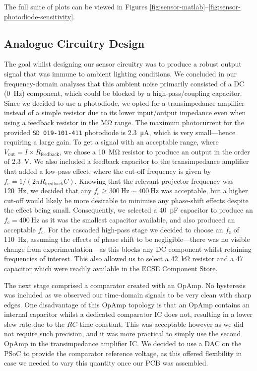 \documentclass[conference]{IEEEtran}
\begin{document}
The full suite of plots can be viewed in Figures \ref{fig:sensor-matlab}–\ref{fig:sensor-photodiode-sensitivity}.

\subsection{Analogue Circuitry Design \label{subsect:analogue}}

The goal whilst designing our sensor circuitry was to produce a robust output signal that was immune to ambient lighting conditions.
We concluded in our frequency-domain analyses that this ambient noise primarily consisted of a DC (\qty{0}{\hertz}) component, which could be blocked by a high-pass/coupling capacitor.
Since we decided to use a photodiode, we opted for a transimpedance amplifier instead of a simple resistor due to its lower input/output impedance even when using a feedback resistor in the \unit{\Mohm} range.
The maximum photocurrent for the provided \texttt{SD 019-101-411} photodiode is \qty{2.3}{\uA}, which is very small—hence requiring a large gain.
To get a signal with an acceptable range, where $V_\text{out} = I \times R_\text{feedback}$, we chose a \qty{10}{\Mohm} resistor to produce an output in the order of \qty{2.3}{\volt}.
We also included a feedback capacitor to the transimpedance amplifier that added a low-pass effect, where the cut-off frequency is given by $f_\text{c} = 1 / (2\pi R_\text{feedback}C)$.
Knowing that the relevant projector frequency was \qty{120}{\hertz}, we decided that any $f_\text{c}\geq \qty{300}{\hertz}\sim \qty{400}{\hertz}$ was acceptable, but a higher cut-off would likely be more desirable to minimise any phase-shift effects despite the effect being small.
Consequently, we selected a \qty{40}{\pF} capacitor to produce an $f_\text{c}=\qty{400}{\hertz}$ as it was the smallest capacitor available, and also produced an acceptable $f_\text{c}$.
For the cascaded high-pass stage we decided to choose an $f_\text{c}$ of \qty{110}{\hertz}, assuming the effects of phase shift to be negligible—there was no visible change from experimentation—as this blocks any DC component whilst retaining frequencies of interest.
This also allowed us to select a \qty{42}{\kohm} resistor and a \qty{47}{\uF} capacitor which were readily available in the ECSE Component Store.

The next stage comprised a comparator created with an OpAmp.
No hysteresis was included as we observed our time-domain signals to be very clean with sharp edges.
One disadvantage of this OpAmp topology is that an OpAmp contains an internal capacitor whilst a dedicated comparator IC does not, resulting in a lower slew rate due to the $RC$ time constant.
This was acceptable however as we did not require such precision, and it was more practical to simply use the second OpAmp in the transimpedance amplifier IC.
We decided to use a DAC on the PSoC to provide the comparator reference voltage, as this offered flexibility in case we needed to vary this quantity once our PCB was assembled.
\end{document}
